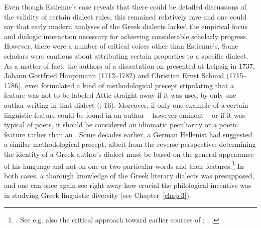 Even though Estienne’s case reveals that there could be detailed discussions of the validity of certain dialect rules, this remained relatively rare and one could say that early modern analyses of the Greek dialects lacked the empirical focus and dialogic interaction necessary for achieving considerable scholarly progress. However, there were a number of critical voices other than Estienne’s. Some scholars were cautious about attributing certain properties to a specific dialect. As a matter of fact, the authors of a dissertation on  presented at Leipzig in 1737, Johann Gottfried Hauptmann (1712–1782) and Christian Ernst Schmid (1715–1786), even formulated a kind of methodological precept stipulating that a feature was not to be labeled Attic straight away if it was used by only one author writing in that dialect (\citealt{Hauptmann1737}: 16). Moreover, if only one example of a certain linguistic feature could be found in an author – however eminent – or if it was typical of poets, it should be considered an idiomatic peculiarity or a poetic feature rather than an . Some decades earlier, a German Hellenist had suggested a similar methodological precept, albeit from the reverse perspective: determining the identity of a Greek author’s dialect must be based on the general appearance of his language and not on one or two particular words and their features.\footnote{\citet[495--496]{Ursin1691}. See e.g. also the critical approach toward earlier sources of \citet{Walper1589}; \citet[{\scriptsize{)(}}.3\textsc{\textsuperscript{r}})]{Portus1603}; \citet[10-12]{Gedike1782}.} In both cases, a thorough knowledge of the Greek literary dialects was presupposed, and one can once again see right away how crucial the philological incentive was in studying Greek linguistic diversity (see Chapter~\ref{chap:3}).


